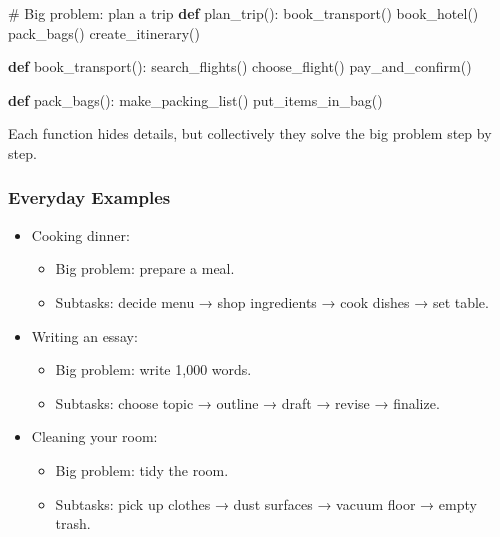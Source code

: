 \documentclass[
  letterpaper,
  DIV=11,
  numbers=noendperiod]{scrreprt}
\newenvironment{Shaded}{\begin{snugshade}}{\end{snugshade}}
\newcommand{\CommentTok}[1]{\textcolor[rgb]{0.37,0.37,0.37}{#1}}
\newcommand{\KeywordTok}[1]{\textcolor[rgb]{0.00,0.23,0.31}{\textbf{#1}}}
\newcommand{\NormalTok}[1]{\textcolor[rgb]{0.00,0.23,0.31}{#1}}
\providecommand{\tightlist}{%
  \setlength{\itemsep}{0pt}\setlength{\parskip}{0pt}}
\begin{document}
\begin{Shaded}
\begin{Highlighting}[]
\CommentTok{\# Big problem: plan a trip}
\KeywordTok{def}\NormalTok{ plan\_trip():}
\NormalTok{    book\_transport()}
\NormalTok{    book\_hotel()}
\NormalTok{    pack\_bags()}
\NormalTok{    create\_itinerary()}

\KeywordTok{def}\NormalTok{ book\_transport():}
\NormalTok{    search\_flights()}
\NormalTok{    choose\_flight()}
\NormalTok{    pay\_and\_confirm()}

\KeywordTok{def}\NormalTok{ pack\_bags():}
\NormalTok{    make\_packing\_list()}
\NormalTok{    put\_items\_in\_bag()}
\end{Highlighting}
\end{Shaded}

Each function hides details, but collectively they solve the big problem
step by step.

\subsubsection{Everyday Examples}\label{everyday-examples-2}

\begin{itemize}
\item
  Cooking dinner:

  \begin{itemize}
  \tightlist
  \item
    Big problem: prepare a meal.
  \item
    Subtasks: decide menu → shop ingredients → cook dishes → set table.
  \end{itemize}
\item
  Writing an essay:

  \begin{itemize}
  \tightlist
  \item
    Big problem: write 1,000 words.
  \item
    Subtasks: choose topic → outline → draft → revise → finalize.
  \end{itemize}
\item
  Cleaning your room:

  \begin{itemize}
  \tightlist
  \item
    Big problem: tidy the room.
  \item
    Subtasks: pick up clothes → dust surfaces → vacuum floor → empty
    trash.
  \end{itemize}
\end{itemize}
\end{document}
